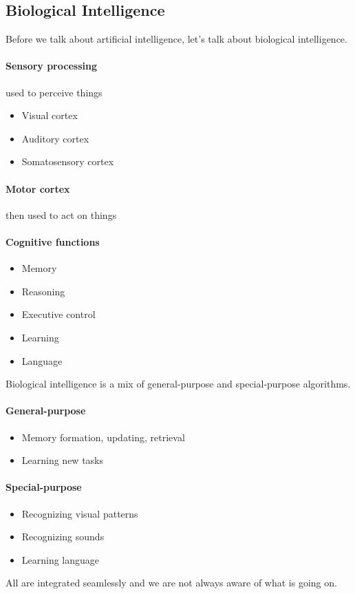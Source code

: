 \documentclass[12 pt]{article}
\begin{document}
        \subsection{Biological Intelligence}
            Before we talk about artificial intelligence, let's talk about
            biological intelligence.
            \paragraph{Sensory processing} used to perceive things
            \begin{itemize}
            \item Visual cortex
            \item Auditory cortex
            \item Somatosensory cortex
            \end{itemize}
            \paragraph{Motor cortex} then used to act on things
            \paragraph{Cognitive functions}
            \begin{itemize}
            \item Memory
            \item Reasoning
            \item Executive control
            \item Learning
            \item Language
            \end{itemize}
            Biological intelligence is a mix of general-purpose and
            special-purpose algorithms.
            \paragraph{General-purpose}
            \begin{itemize}
            \item Memory formation, updating, retrieval
            \item Learning new tasks
            \end{itemize}
            \paragraph{Special-purpose}
            \begin{itemize}
            \item Recognizing visual patterns
            \item Recognizing sounds
            \item Learning language
            \end{itemize}
            All are integrated seamlessly and we are not always aware
            of what is going on.
\end{document}
